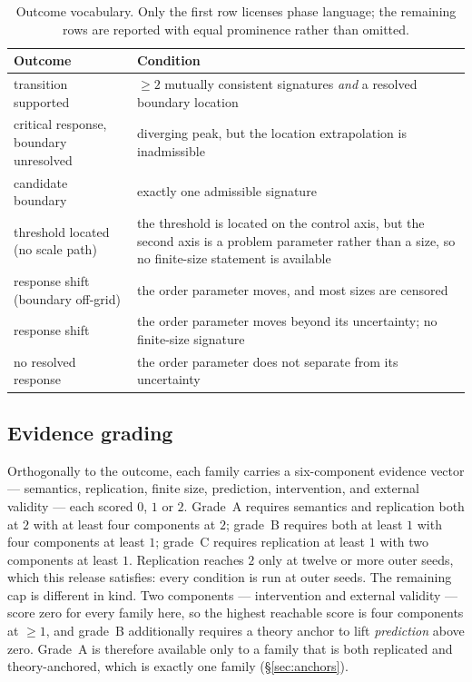 \begin{table}[tbp]
\centering\small
\begin{tabularx}{\linewidth}{@{}p{52mm}Y@{}}
\toprule
Outcome & Condition \\
\midrule
transition supported & $\ge2$ mutually consistent signatures \emph{and} a
resolved boundary location \\
critical response, boundary unresolved & diverging peak, but the location
extrapolation is inadmissible \\
candidate boundary & exactly one admissible signature \\
threshold located (no scale path) & the threshold is located on the control
axis, but the second axis is a problem parameter rather than a size, so no
finite-size statement is available \\
response shift (boundary off-grid) & the order parameter moves, and most sizes
are censored \\
response shift & the order parameter moves beyond its uncertainty; no
finite-size signature \\
no resolved response & the order parameter does not separate from its
uncertainty \\
\bottomrule
\end{tabularx}
\caption{Outcome vocabulary. Only the first row licenses phase language; the
remaining rows are reported with equal prominence rather than omitted.}
\label{tab:outcomes}
\end{table}

\subsection{Evidence grading}

Orthogonally to the outcome, each family carries a six-component evidence
vector --- semantics, replication, finite size, prediction, intervention, and
external validity --- each scored $0$, $1$ or $2$. Grade~A requires semantics
and replication both at $2$ with at least four components at $2$; grade~B
requires both at least $1$ with four components at least $1$; grade~C requires
replication at least $1$ with two components at least $1$. Replication reaches
$2$ only at twelve or more outer seeds, which this release satisfies: every
condition is run at \AtlasSpecializationSeeds{} outer seeds. The remaining cap
is different in kind. Two components --- intervention and external validity ---
score zero for every family here, so the highest reachable score is four
components at $\ge1$, and grade~B additionally requires a theory anchor to lift
\emph{prediction} above zero. Grade~A is therefore available only to a family
that is both replicated and theory-anchored, which is exactly one family
(\S\ref{sec:anchors}).

